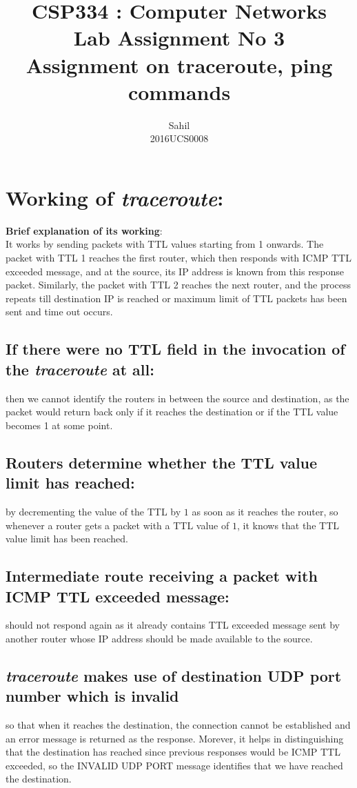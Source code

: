 \documentclass[]{report}
\title{\centering CSP334 : Computer Networks \\Lab Assignment No 3\\Assignment on traceroute, ping commands}
\author{\LARGE Sahil\\2016UCS0008}
\begin{document}
\maketitle

\section{Working of \textit{traceroute}:}
\textbf{Brief explanation of its working}: 
\\ 
It works by sending packets with TTL values starting from 1 onwards. The packet with TTL 1 reaches the first router, which then responds with ICMP TTL exceeded message, and at the source, its IP address is known from this response packet. Similarly, the packet with TTL 2 reaches the next router, and the process repeats till destination IP is reached or maximum limit of TTL packets has been sent and time out occurs. 

\subsection{If there were no TTL field in the invocation of the \textit{traceroute} at all:}
then we cannot identify the routers in between the source and destination, as the packet would return back only if it reaches the destination or if the TTL value becomes 1 at some point.

\subsection{Routers determine whether the TTL value limit has reached:} 
by decrementing the value of the TTL by $1$ as soon as it  reaches the router, so whenever a router gets a packet with a TTL value of $1$, it knows that the TTL value limit has been reached.

\subsection{Intermediate route receiving a packet with ICMP TTL exceeded message: }
should not respond again as it already contains TTL exceeded message sent by another router whose IP address should be made available to the source. 

\subsection{\textit{traceroute} makes use of destination UDP port number which is invalid} 
so that when it reaches the destination, the connection cannot be established and an error message is returned as the response. Morever, it helps in distinguishing that the destination has reached since previous responses would be ICMP TTL exceeded, so the INVALID UDP PORT message identifies that we have reached the destination.
\end{document}

